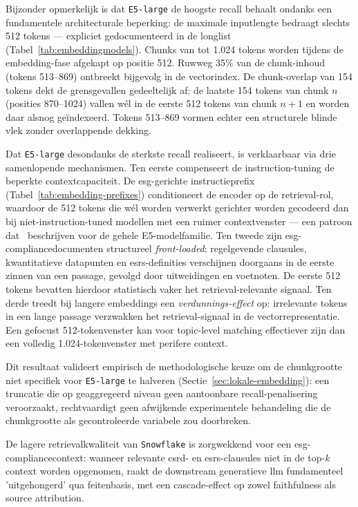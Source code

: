 Bijzonder opmerkelijk is dat \texttt{E5-large} de hoogste recall behaalt ondanks een fundamentele architecturale beperking: de maximale inputlengte bedraagt slechts 512 tokens — expliciet gedocumenteerd in de longlist (Tabel~\ref{tab:embeddingmodels}). Chunks van tot 1.024 tokens worden tijdens de embedding-fase afgekapt op positie 512. Ruwweg 35\% van de chunk-inhoud (tokens 513–869) ontbreekt bijgevolg in de vectorindex. De chunk-overlap van 154 tokens dekt de grensgevallen gedeeltelijk af: de laatste 154 tokens van chunk $n$ (posities 870–1024) vallen wél in de eerste 512 tokens van chunk $n+1$ en worden daar alsnog geïndexeerd. Tokens 513–869 vormen echter een structurele blinde vlek zonder overlappende dekking.

Dat \texttt{E5-large} desondanks de sterkste recall realiseert, is verklaarbaar via drie samenlopende mechanismen. Ten eerste compenseert de instruction-tuning de beperkte contextcapaciteit. De \gls{esg}-gerichte instructieprefix (Tabel~\ref{tab:embedding-prefixes}) conditioneert de encoder op de retrieval-rol, waardoor de 512 tokens die wél worden verwerkt gerichter worden gecodeerd dan bij niet-instruction-tuned modellen met een ruimer contextvenster — een patroon dat~\textcite{WangEtAl2022} beschrijven voor de gehele E5-modelfamilie. Ten tweede zijn \gls{esg}-compliancedocumenten structureel \textit{front-loaded}: regelgevende clausules, kwantitatieve datapunten en \gls{esrs}-definities verschijnen doorgaans in de eerste zinnen van een passage, gevolgd door uitweidingen en voetnoten. De eerste 512 tokens bevatten hierdoor statistisch vaker het retrieval-relevante signaal. Ten derde treedt bij langere embeddings een \textit{verdunnings-effect} op: irrelevante tokens in een lange passage verzwakken het retrieval-signaal in de vectorrepresentatie. Een gefocust 512-tokenvenster kan voor topic-level matching effectiever zijn dan een volledig 1.024-tokenvenster met perifere context.

Dit resultaat valideert empirisch de methodologische keuze om de chunkgrootte niet specifiek voor \texttt{E5-large} te halveren (Sectie~\ref{sec:lokale-embedding}): een truncatie die op geaggregeerd niveau geen aantoonbare recall-penalisering veroorzaakt, rechtvaardigt geen afwijkende experimentele behandeling die de chunkgrootte als gecontroleerde variabele zou doorbreken.

De lagere retrievalkwaliteit van \texttt{Snowflake} is zorgwekkend voor een \gls{esg}-compliancecontext: wanneer relevante \gls{csrd}- en \gls{esrs}-clausules niet in de top-$k$ context worden opgenomen, raakt de downstream generatieve \gls{llm} fundamenteel 'uitgehongerd' qua feitenbasis, met een cascade-effect op zowel faithfulness als source attribution.

